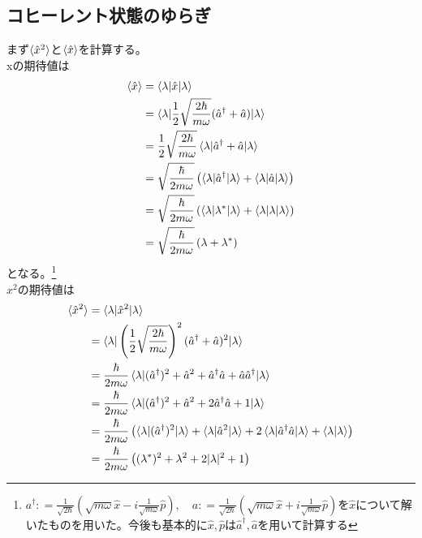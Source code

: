 \documentclass{jsarticle}  %
\numberwithin{equation}{section} %
\numberwithin{figure}{section}
\begin{document}
\subsection{コヒーレント状態のゆらぎ}
    まず$\braket{\hat{x}^2}$と$\braket{\hat{x}}$を計算する。\\
    xの期待値は
    \begin{align}
        \braket{\hat{x}} &= \braket{\lambda|\hat{x}|\lambda} \notag \\
        &=\braket{\lambda|\frac{1}{2}\sqrt{\frac{2\hbar}{m\omega}} (\hat{a}^\dagger + \hat{a}) |\lambda} \notag \\
        &=\frac{1}{2}\sqrt{\frac{2\hbar}{m\omega}} \braket{\lambda| \hat{a}^\dagger + \hat{a} |\lambda} \notag \\
        &= \sqrt{\frac{\hbar}{2m\omega}} \left( \braket{\lambda|\hat{a}^\dagger|\lambda} + \braket{\lambda|\hat{a}|\lambda} \right) \notag \\
        &= \sqrt{\frac{\hbar}{2m\omega}} \left( \braket{\lambda|\lambda^*|\lambda} + \braket{\lambda|\lambda|\lambda} \right) \notag \\
        &= \sqrt{\frac{\hbar}{2m\omega}} \left( \lambda + \lambda^*\right)
    \end{align}
    となる。\footnote{$a^\dagger : = \frac{1}{\sqrt{2\hbar}}\left( \sqrt{m\omega} \hat{x} -i \frac{1}{\sqrt{m\omega}} \hat{p}\right) ,\quad a : = \frac{1}{\sqrt{2\hbar}}\left( \sqrt{m\omega} \hat{x} +i \frac{1}{\sqrt{m\omega}} \hat{p}\right)$を$\hat{x}$について解いたものを用いた。今後も基本的に$\hat{x},\hat{p}$は$\hat{a}^\dagger,\hat{a}$を用いて計算する}\\
    $x^2$の期待値は
    \begin{align}
        \braket{{\hat{x}}^2} &= \braket{\lambda|{\hat{x}}^2|\lambda} \notag \\
        &=\braket{\lambda|\left( \frac{1}{2}\sqrt{\frac{2\hbar}{m\omega}} \right)^2 (\hat{a}^\dagger + \hat{a})^2 |\lambda} \notag \\
        &=\frac{\hbar}{2m\omega} \braket{\lambda| (\hat{a}^\dagger)^2 + {\hat{a}}^2 + {\hat{a}}^\dagger \hat{a} + \hat{a} {\hat{a}}^\dagger |\lambda} \notag \\
        &=\frac{\hbar}{2m\omega}\braket{\lambda| (\hat{a}^\dagger)^2 + {\hat{a}}^2 + 2{\hat{a}}^\dagger \hat{a} + 1 |\lambda} \notag \\
        &=\frac{\hbar}{2m\omega} \left( \braket{\lambda |(\hat{a}^\dagger)^2|\lambda } + \braket{\lambda|\hat{a}^2 |\lambda} + 2\braket{\lambda|\hat{a}^\dagger \hat{a}|\lambda} + \braket{\lambda|\lambda} \right)\notag \\
        &=\frac{\hbar}{2m\omega} \left( (\lambda^*)^2 + \lambda^2 + 2|\lambda|^2 + 1\right)
    \end{align}
\end{document}
